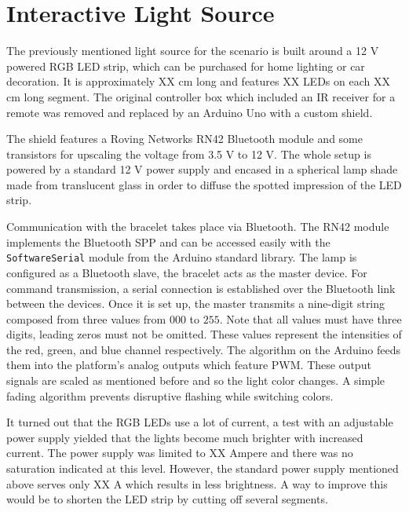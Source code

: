 \chapter{Interactive Light Source}

The previously mentioned light source for the scenario is built around a 12 V powered RGB \ac{LED} strip, which can be purchased for home lighting or car decoration. It is approximately XX cm long and features XX \ac{LED}s on each XX cm long segment. The original controller box which included an \ac{IR} receiver for a remote was removed and replaced by an Arduino Uno \cite{arduino_uno} with a custom shield. 

The shield features a Roving Networks RN42 Bluetooth module \cite{datasheet_rn42} and some transistors for upscaling the voltage from 3.5 V to 12 V. The whole setup is powered by a standard 12 V power supply and encased in a spherical lamp shade made from translucent glass in order to diffuse the spotted impression of the LED strip. 

Communication with the bracelet takes place via Bluetooth. The RN42 module implements the Bluetooth \ac{SPP} and can be accessed easily with the \texttt{SoftwareSerial} module from the Arduino standard library. The lamp is configured as a Bluetooth slave, the bracelet acts as the master device. For command transmission, a serial connection is established over the Bluetooth link between the devices. Once it is set up, the master transmits a nine-digit string composed from three values from $000$ to $255$. Note that all values must have three digits, leading zeros must not be omitted. These values represent the intensities of the red, green, and blue channel respectively. The algorithm on the Arduino feeds them into the platform's analog outputs which feature \ac{PWM}. These output signals are scaled as mentioned before and so the light color changes. A simple fading algorithm prevents disruptive flashing while switching colors.

It turned out that the RGB \ac{LED}s use a lot of current, a test with an adjustable power supply yielded that the lights become much brighter with increased current. The power supply was limited to XX Ampere and there was no saturation indicated at this level. However, the standard power supply mentioned above serves only XX A which results in less brightness. A way to improve this would be to shorten the \ac{LED} strip by cutting off several segments.